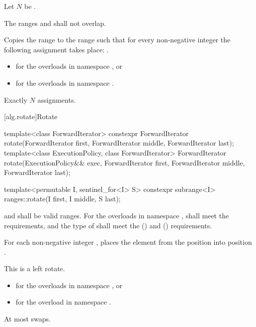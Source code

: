 \begin{itemdescr}
\pnum
Let $N$ be .

\pnum
\requires
The ranges  and 
shall not overlap.

\pnum
\effects
Copies the range  to the range 
such that for every non-negative integer 
the following assignment takes place:
.

\pnum
\returns
\begin{itemize}
\item
   for the overloads in namespace , or
\item
   for the overloads in namespace .
\end{itemize}

\pnum
\complexity
Exactly $N$ assignments.
\end{itemdescr}

[alg.rotate]{Rotate}

%
\begin{itemdecl}
template<class ForwardIterator>
  constexpr ForwardIterator
    rotate(ForwardIterator first, ForwardIterator middle, ForwardIterator last);
template<class ExecutionPolicy, class ForwardIterator>
  ForwardIterator
    rotate(ExecutionPolicy&& exec,
           ForwardIterator first, ForwardIterator middle, ForwardIterator last);

template<permutable I, sentinel_for<I> S>
  constexpr subrange<I> ranges::rotate(I first, I middle, S last);
\end{itemdecl}

\begin{itemdescr}
\pnum
\requires
{} and  shall be valid ranges.
For the overloads in namespace ,
 shall meet
the  requirements, and
the type of  shall meet
the  () and
 () requirements.

\pnum
\effects
For each non-negative integer ,
places the element from the position 
into position .
\begin{note}
This is a left rotate.
\end{note}

\pnum
\returns
\begin{itemize}
\item
  for the overloads in namespace , or
\item
  for the overload in namespace .
\end{itemize}

\pnum
\complexity
At most  swaps.
\end{itemdescr}

